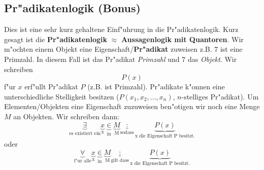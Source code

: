 \subsection{Pr"adikatenlogik (Bonus)}
Dies ist eine sehr kurz gehaltene Einf"uhrung in die Pr"adikatenlogik. Kurz gesagt ist die \textbf{Pr"adikatenlogik} \textbf{$\approx$} \textbf{Aussagenlogik mit Quantoren}. Wir m"ochten einem Objekt eine Eigenschaft/\textbf{Pr"adikat} zuweisen z.B. \glqq$7$ ist eine Primzahl\grqq . In diesem Fall ist das Pr"adikat \textit{Primzahl} und $7$ das \textit{Objekt}. Wir schreiben 
\begin{equation*}
P(x)
\end{equation*}
f"ur $x$ erf"ullt Pr"adikat $P$ (z.B. \glqq ist Primzahl\grqq ). Pr"adikate k"onnen eine unterschiedliche Stelligkeit besitzen ($P(x_1, x_2, \ldots, x_n)$, $n$-stelliges Pr"adikat). Um Elementen/Objekten eine Eigenschaft zuzuweisen ben"otigen wir noch eine Menge $M$ an Objekten. Wir schreiben dann:
\begin{equation*}
\underbrace{\exists}_{\text{es existiert ein}} \underbrace{x}_{\text{x}} \underbrace{\in}_{\text{in}} \underbrace{M}_{\text{M}} \underbrace{:}_{\text{sodass}} \underbrace{P(x)}_{\text{x die Eigenschaft P besitzt.}}
\end{equation*}
oder
\begin{equation*}
\underbrace{\forall}_{\text{f"ur alle}} \underbrace{x}_{\text{x}} \underbrace{\in}_{\text{in}} \underbrace{M}_{\text{M}} \underbrace{:}_{\text{gilt dass}} \underbrace{P(x)}_{\text{x die Eigenschaft P besitzt.}}
\end{equation*}

